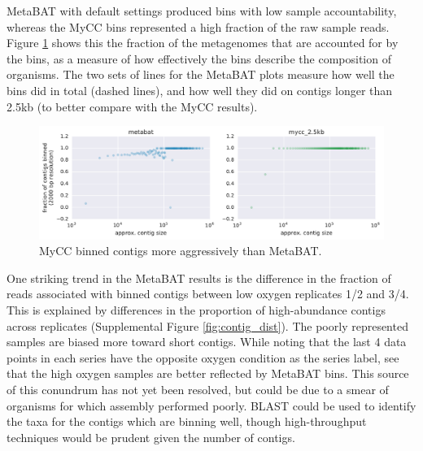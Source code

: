MetaBAT with default settings produced bins with low sample accountability, whereas the MyCC bins represented a high fraction of the raw sample reads.
Figure \ref{fig:mycc_binned_more_contigs} shows this the fraction of the metagenomes that are accounted for by the bins, as a measure of how effectively the bins describe the composition of organisms.
The two sets of lines for the MetaBAT plots measure how well the bins did in total (dashed lines), and how well they did on contigs longer than 2.5kb (to better compare with the MyCC results).


\begin{figure}[H]
\centering
    \includegraphics[width=1.0\textwidth]{./tex/chapter2/figures/170206_improved_fracs_of_contigs_binned_by_MyCC.pdf}
    \begin{singlespace}
    \caption[MyCC binned contigs more aggressively than MetaBAT]{
        MyCC binned contigs more aggressively than MetaBAT.}
    \label{fig:mycc_binned_more_contigs}
    \end{singlespace}
\end{figure}

One striking trend in the MetaBAT results is the difference in the fraction of reads associated with binned contigs between low oxygen replicates 1/2 and 3/4.
This is explained by differences in the proportion of high-abundance contigs across replicates (Supplemental Figure \ref{fig:contig_dist}).
The poorly represented samples are biased more toward short contigs.
While noting that the last 4 data points in each series have the opposite oxygen condition as the series label, see that the high oxygen samples are better reflected by MetaBAT bins.
This source of this conundrum has not yet been resolved, but could be due to a smear of organisms for which assembly performed poorly.
BLAST could be used to identify the taxa for the contigs which are binning well, though high-throughput techniques would be prudent given the number of contigs.

